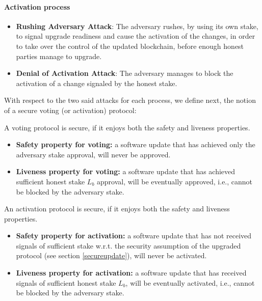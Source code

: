 \paragraph{Activation process}
\begin{itemize}
	\item \textbf{Rushing Adversary Attack}: The adversary rushes, by using its 
	own stake, to signal upgrade readiness and cause the activation of the 
	changes, in order to take over the control of the updated blockchain, 
	before enough honest parties manage to upgrade. 
	\item \textbf{Denial of Activation Attack}: The 
	adversary manages to block the activation of a change signaled by the 
	honest stake.
\end{itemize}


With respect to the two said attacks for each process, we define next, the 
notion of a secure voting (or activation) protocol:
\begin{definition}\label{def:liveness_safety_voting}
	A voting protocol is secure, if it enjoys both the safety 
	and liveness properties.
	
	\begin{itemize}
		\item \textbf{Safety property for voting:} a software update that has 
		achieved 
		only the adversary stake approval, will never be approved.
		
		\item \textbf{Liveness property for voting:} a software update that has 
		achieved 
		sufficient honest stake $L_b$ approval, will be eventually approved, 
		i.e., cannot be blocked by the adversary stake.		
	\end{itemize}	
\end{definition}


\begin{definition}\label{def:liveness_safety_activation}
	An activation protocol is secure, if it enjoys both the safety 
	and liveness properties.
	
	\begin{itemize}
		\item \textbf{Safety property for activation:} a software update that 
		has not received signals of sufficient  stake w.r.t. the 
		security assumption of the upgraded protocol (see section 
		\ref{secureupdate}), will never be activated.
		
		\item \textbf{Liveness property for activation:} a software update that 
		has received
		signals of sufficient honest stake $L_b$, will be eventually activated, 
		i.e., cannot be blocked by the adversary stake.		
	\end{itemize}	
\end{definition}

